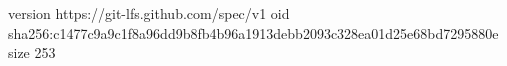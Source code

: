 version https://git-lfs.github.com/spec/v1
oid sha256:c1477c9a9c1f8a96dd9b8fb4b96a1913debb2093c328ea01d25e68bd7295880e
size 253
